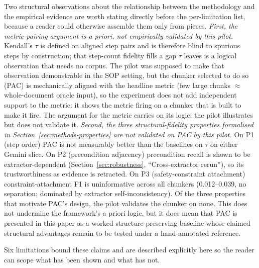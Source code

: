 \documentclass[make,article,submit,oneauthor,pdftex]{Definitions/mdpi}
\begin{document}
Two structural observations about the relationship between the
methodology and the empirical evidence are worth stating directly
before the per-limitation list, because a reader could otherwise
assemble them only from pieces. \emph{First, the metric-pairing
argument is a priori, not empirically validated by this pilot.}
Kendall's $\tau$ is defined on aligned step pairs and is therefore
blind to spurious steps by construction; that step-count fidelity
fills a gap $\tau$ leaves is a logical observation that needs no
corpus. The pilot was supposed to make that observation
demonstrable in the SOP setting, but the chunker selected to do so
(PAC) is mechanically aligned with the headline metric (few large
chunks $\approx$ whole-document oracle input), so the experiment does
not add independent support to the metric: it shows the metric
firing on a chunker that is built to make it fire. The argument for
the metric carries on its logic; the pilot illustrates but does not
validate it. \emph{Second, the three structural-fidelity properties
formalised in Section~\ref{sec:methods-properties} are not validated
on PAC by this pilot.} On P1 (step order) PAC is not measurably
better than the baselines on $\tau$ on either Gemini slice. On P2
(precondition adjacency) precondition recall is shown to be
extractor-dependent (Section~\ref{sec:robustness}, ``Cross-extractor
rerun''), so its trustworthiness as evidence is retracted. On P3
(safety-constraint attachment) constraint-attachment F1 is
uninformative across all chunkers (0.012--0.039, no separation;
dominated by extractor self-inconsistency). Of the three properties
that motivate PAC's design, the pilot validates the chunker on none.
This does not undermine the framework's a priori logic, but it does
mean that PAC is presented in this paper as a worked
structure-preserving baseline whose claimed structural advantages
remain to be tested under a hand-annotated reference.

Six limitations bound these claims and are described explicitly here
so the reader can scope what has been shown and what has not.
\end{document}
